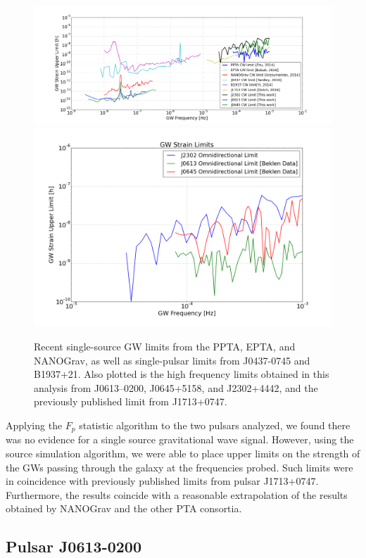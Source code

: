 \documentclass[12pt]{article}
\begin{document}
\begin{figure}
    \caption{Recent single-source GW limits from the PPTA, EPTA, and NANOGrav,
as well as single-pulsar limits from J0437-0745 and B1937+21. Also plotted is
the high frequency limits obtained in this analysis from J0613--0200,
    J0645+5158, and
J2302+4442, and the previously published limit from J1713+0747.}
    \includegraphics[width=1\textwidth]{./figures/all_limits_incfall.png}
    \includegraphics[width=1\textwidth]{./figures/hf_limits.png}
\end{figure}

Applying the $F_p$ statistic algorithm to the two pulsars analyzed, we found
there was no evidence for a single source gravitational wave signal. However,
using the source simulation algorithm, we were able to place upper limits on the
strength of the GWs passing through the galaxy at the
frequencies probed. Such limits were in coincidence with previously published
limits from pulsar J1713+0747. Furthermore, the results coincide with a
reasonable extrapolation of the results obtained by NANOGrav and the other PTA
consortia.

\subsection{Pulsar J0613-0200}
\end{document}
